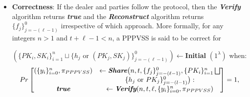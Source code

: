 \begin{itemize}
  \item \textbf{Correctness}: If the dealer and parties follow the protocol, then the \textit{\textbf{Verify}} 
    algorithm returns \textit{\textbf{true}} and the \textit{\textbf{Reconstruct}} algorithm returns $\{f_j\}_{j=-(\ell-1)}^0$ 
    irrespective of which approach. More formally, for any integers $n>1$ and $t+\ell-1<n$, a PPPVSS is said 
    to be correct for\par 
    $\left(\{PK_i,SK_i\}_{i=1}^n\sqcup\{h_j\text{ or }(PK_j,SK_j)\}_{j=-(\ell-1)}^0\right)\leftarrow$\textbf{Initial} $(1^\lambda)$ when:
    \begin{align*}
      Pr\begin{bmatrix}
        (\{y_i\}_{i=0}^n,\pi_{PPPVSS})&\leftarrow \textit{\textbf{Share}} \big(n,t,\{f_j\}_{j=-(\ell-1)}^0,\{PK_i\}_{i=1}^n\bigsqcup\\
        &\{h_j\text{ or }PK_j\}_{j=-(l-1)}^0\big):\\
        \textit{\textbf{true}}&\leftarrow \textit{\textbf{Verify}} (n,t,\ell,\{y_i\}_{i=0}^n,\pi_{PPPVSS})
      \end{bmatrix} = 1,
    \end{align*}


\end{itemize}
